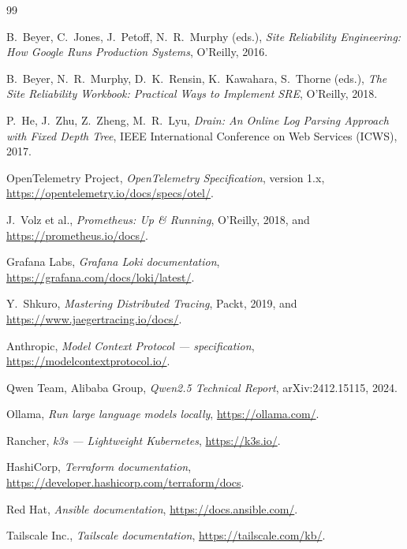 \documentclass[11pt,a4paper,oneside]{report}
\begin{document}
\begin{thebibliography}{99}

B.~Beyer, C.~Jones, J.~Petoff, N.~R.~Murphy (eds.),
\emph{Site Reliability Engineering: How Google Runs Production Systems},
O'Reilly, 2016.

B.~Beyer, N.~R.~Murphy, D.~K.~Rensin, K.~Kawahara, S.~Thorne (eds.),
\emph{The Site Reliability Workbook: Practical Ways to Implement SRE},
O'Reilly, 2018.

P.~He, J.~Zhu, Z.~Zheng, M.~R.~Lyu, \emph{Drain: An Online Log Parsing
Approach with Fixed Depth Tree}, IEEE International Conference on Web
Services (ICWS), 2017.

OpenTelemetry Project,
\emph{OpenTelemetry Specification}, version 1.x,
\url{https://opentelemetry.io/docs/specs/otel/}.

J.~Volz et al.,
\emph{Prometheus: Up \& Running}, O'Reilly, 2018, and
\url{https://prometheus.io/docs/}.

Grafana Labs,
\emph{Grafana Loki documentation}, \url{https://grafana.com/docs/loki/latest/}.

Y.~Shkuro,
\emph{Mastering Distributed Tracing}, Packt, 2019,
and \url{https://www.jaegertracing.io/docs/}.

Anthropic,
\emph{Model Context Protocol --- specification},
\url{https://modelcontextprotocol.io/}.

Qwen Team, Alibaba Group,
\emph{Qwen2.5 Technical Report},
arXiv:2412.15115, 2024.

Ollama,
\emph{Run large language models locally},
\url{https://ollama.com/}.

Rancher,
\emph{k3s --- Lightweight Kubernetes},
\url{https://k3s.io/}.

HashiCorp,
\emph{Terraform documentation},
\url{https://developer.hashicorp.com/terraform/docs}.

Red Hat,
\emph{Ansible documentation},
\url{https://docs.ansible.com/}.

Tailscale Inc.,
\emph{Tailscale documentation},
\url{https://tailscale.com/kb/}.

\end{thebibliography}
\end{document}
